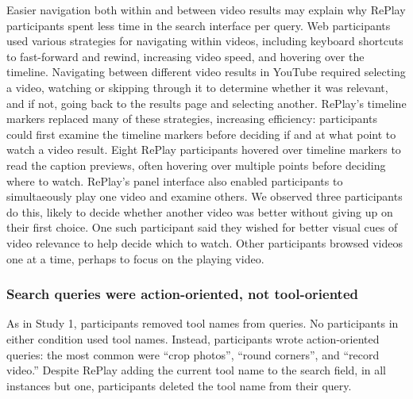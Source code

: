 Easier navigation both within and between video results may explain why RePlay participants spent less time in the search interface per query. Web participants used various strategies for navigating within videos, including keyboard shortcuts to fast-forward and rewind, increasing video speed, and hovering over the timeline. Navigating between different video results in YouTube required selecting a video, watching or skipping through it to determine whether it was relevant, and if not, going back to the results page and selecting another. RePlay's timeline markers replaced many of these strategies, increasing efficiency: participants could first examine the timeline markers before deciding if and at what point to watch a video result. Eight RePlay participants hovered over timeline markers to read the caption previews, often hovering over multiple points before deciding where to watch. RePlay's panel interface also enabled participants to simultaeously play one video and examine others. We observed three participants do this, likely to decide whether another video was better without giving up on their first choice. One such participant said they wished for better visual cues of video relevance to help decide which to watch. Other participants browsed videos one at a time, perhaps to focus on the playing video.


\subsubsection{Search queries were action-oriented, not tool-oriented}
As in Study 1, participants removed tool names from queries. No participants in either condition used tool names. Instead, participants wrote action-oriented queries: the most common were ``crop photos'', ``round corners'', and ``record video.'' Despite RePlay adding the current tool name to the search field, in all instances but one, participants deleted the tool name from their query.

